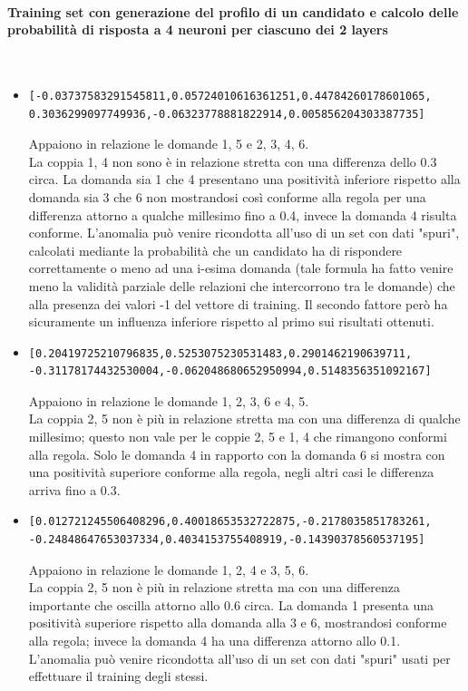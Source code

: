 \paragraph{Training set con generazione del profilo di un candidato e calcolo delle probabilit\`a di risposta a 4 neuroni per ciascuno dei 2 layers}\mbox{}
\label{Training set con generazione del profilo di un candidato e calcolo delle probabilita di risposta a 4 neuroni per ciascuno dei 2 layers}
\\
\noindent
\begin{itemize}
\item  \begin{verbatim}[-0.03737583291545811,0.05724010616361251,0.44784260178601065,
0.3036299097749936,-0.06323778881822914,0.005856204303387735]
\end{verbatim}
Appaiono in relazione le domande 1, 5 e 2, 3, 4, 6.\\
La coppia 1, 4 non sono \`e in relazione stretta con una differenza dello 0.3 circa. La domanda  sia 1 che 4 presentano una positivit\`a inferiore rispetto alla domanda sia 3 che 6 non mostrandosi cos\`i conforme alla regola per una differenza attorno a qualche millesimo fino a 0.4, invece la domanda 4 risulta conforme. L'anomalia pu\`o venire ricondotta all'uso di un set con dati "spuri", calcolati mediante la probabilit\`a che un candidato ha di rispondere correttamente o meno ad una i-esima domanda (tale formula ha fatto venire meno la validit\`a parziale delle relazioni che intercorrono tra le domande) che alla presenza dei valori -1 del vettore di training. Il secondo fattore per\`o ha sicuramente un influenza inferiore rispetto al primo sui risultati ottenuti.

\item \begin{verbatim}[0.20419725210796835,0.5253075230531483,0.2901462190639711,
-0.31178174432530004,-0.062048680652950994,0.5148356351092167]

\end{verbatim}
Appaiono in relazione le domande 1, 2, 3, 6 e 4, 5.\\
La coppia 2, 5 non \`e pi\`u in relazione stretta ma con una differenza di qualche millesimo; questo non vale per le coppie 2, 5 e 1, 4 che rimangono conformi alla regola. Solo le domanda 4 in rapporto con la domanda 6 si mostra con una positivit\`a superiore conforme alla regola, negli altri casi le differenza arriva fino a 0.3.

\item  \begin{verbatim}[0.012721245506408296,0.40018653532722875,-0.2178035851783261,
-0.24848647653037334,0.4034153755408919,-0.14390378560537195]
\end{verbatim}
Appaiono in relazione le domande 1, 2, 4 e  3, 5, 6.\\
La coppia 2, 5 non \`e pi\`u in relazione stretta ma con una differenza importante che oscilla attorno allo 0.6 circa. La domanda 1 presenta una positivit\`a superiore rispetto alla domanda alla 3 e 6, mostrandosi  conforme alla regola; invece la domanda 4 ha una differenza  attorno allo 0.1. L'anomalia pu\`o venire ricondotta all'uso di un set con dati "spuri"  usati per effettuare il training degli stessi.


\end{itemize}
